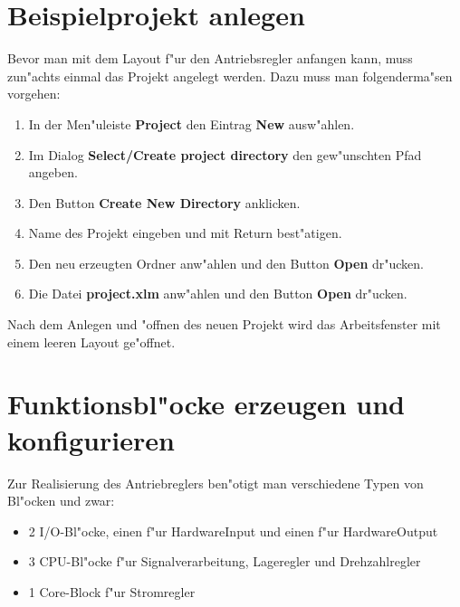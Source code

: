 \section {Beispielprojekt  anlegen}
Bevor man mit dem Layout f"ur den Antriebsregler anfangen kann, muss zun"achts einmal das Projekt angelegt werden. Dazu muss man folgenderma"sen vorgehen:
\begin{enumerate}
	\item In der Men"uleiste {\bf Project} den Eintrag {\bf New} ausw"ahlen.
	\item Im Dialog {\bf Select/Create project directory} den gew"unschten Pfad angeben.
	\item Den Button {\bf Create New Directory} anklicken.
	\item Name des Projekt eingeben und mit Return best"atigen.
	\item Den neu erzeugten Ordner anw"ahlen und den Button {\bf Open} dr"ucken.
	\item Die Datei {\bf project.xlm} anw"ahlen und den Button {\bf Open} dr"ucken.
\end{enumerate}
Nach dem Anlegen und "offnen des neuen Projekt wird das Arbeitsfenster mit einem leeren Layout ge"offnet.
\section{Funktionsbl"ocke erzeugen und konfigurieren}
Zur Realisierung des Antriebreglers ben"otigt man verschiedene Typen von Bl"ocken und zwar:
\begin{itemize}
	\item 2 I/O-Bl"ocke, einen f"ur HardwareInput und einen f"ur HardwareOutput
	\item 3 CPU-Bl"ocke f"ur Signalverarbeitung, Lageregler und Drehzahlregler
	\item 1 Core-Block f"ur Stromregler
\end{itemize}
